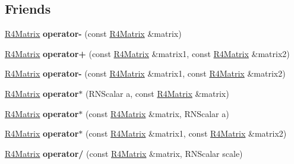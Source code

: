 \subsection*{Friends}
\begin{DoxyCompactItemize}
\item 
\hyperlink{class_r4_matrix}{R4\+Matrix} {\bfseries operator-\/} (const \hyperlink{class_r4_matrix}{R4\+Matrix} \&matrix)\hypertarget{class_r4_matrix_a0335cf00840008a90e7fbb41a03e690e}{}\label{class_r4_matrix_a0335cf00840008a90e7fbb41a03e690e}

\item 
\hyperlink{class_r4_matrix}{R4\+Matrix} {\bfseries operator+} (const \hyperlink{class_r4_matrix}{R4\+Matrix} \&matrix1, const \hyperlink{class_r4_matrix}{R4\+Matrix} \&matrix2)\hypertarget{class_r4_matrix_af291f6e16a0b5d89187b820da3a1803e}{}\label{class_r4_matrix_af291f6e16a0b5d89187b820da3a1803e}

\item 
\hyperlink{class_r4_matrix}{R4\+Matrix} {\bfseries operator-\/} (const \hyperlink{class_r4_matrix}{R4\+Matrix} \&matrix1, const \hyperlink{class_r4_matrix}{R4\+Matrix} \&matrix2)\hypertarget{class_r4_matrix_a0f3bfbcff1370c8e51765553dbb93dab}{}\label{class_r4_matrix_a0f3bfbcff1370c8e51765553dbb93dab}

\item 
\hyperlink{class_r4_matrix}{R4\+Matrix} {\bfseries operator$\ast$} (R\+N\+Scalar a, const \hyperlink{class_r4_matrix}{R4\+Matrix} \&matrix)\hypertarget{class_r4_matrix_a3b5724af5f7caae42f83391211d04826}{}\label{class_r4_matrix_a3b5724af5f7caae42f83391211d04826}

\item 
\hyperlink{class_r4_matrix}{R4\+Matrix} {\bfseries operator$\ast$} (const \hyperlink{class_r4_matrix}{R4\+Matrix} \&matrix, R\+N\+Scalar a)\hypertarget{class_r4_matrix_a2220e28b96fe4be676795b12c1cd5739}{}\label{class_r4_matrix_a2220e28b96fe4be676795b12c1cd5739}

\item 
\hyperlink{class_r4_matrix}{R4\+Matrix} {\bfseries operator$\ast$} (const \hyperlink{class_r4_matrix}{R4\+Matrix} \&matrix1, const \hyperlink{class_r4_matrix}{R4\+Matrix} \&matrix2)\hypertarget{class_r4_matrix_ac684b848929e9e9cf77323c7122ee83a}{}\label{class_r4_matrix_ac684b848929e9e9cf77323c7122ee83a}

\item 
\hyperlink{class_r4_matrix}{R4\+Matrix} {\bfseries operator/} (const \hyperlink{class_r4_matrix}{R4\+Matrix} \&matrix, R\+N\+Scalar scale)\hypertarget{class_r4_matrix_a645a3f5df995087fa68669880d96f894}{}\label{class_r4_matrix_a645a3f5df995087fa68669880d96f894}


\end{DoxyCompactItemize}
